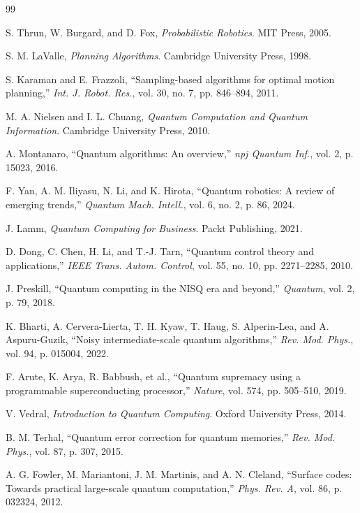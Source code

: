\documentclass[conference]{IEEEtran}
\begin{document}
\begin{thebibliography}{99}

 S. Thrun, W. Burgard, and D. Fox, \textit{Probabilistic Robotics}. MIT Press, 2005.

 S. M. LaValle, \textit{Planning Algorithms}. Cambridge University Press, 1998.

 S. Karaman and E. Frazzoli, ``Sampling-based algorithms for optimal motion planning,'' \textit{Int. J. Robot. Res.}, vol. 30, no. 7, pp. 846--894, 2011.

 M. A. Nielsen and I. L. Chuang, \textit{Quantum Computation and Quantum Information}. Cambridge University Press, 2010.

 A. Montanaro, ``Quantum algorithms: An overview,'' \textit{npj Quantum Inf.}, vol. 2, p. 15023, 2016.

 F. Yan, A. M. Iliyasu, N. Li, and K. Hirota, ``Quantum robotics: A review of emerging trends,'' \textit{Quantum Mach. Intell.}, vol. 6, no. 2, p. 86, 2024.

 J. Lamm, \textit{Quantum Computing for Business}. Packt Publishing, 2021.

 D. Dong, C. Chen, H. Li, and T.-J. Tarn, ``Quantum control theory and applications,'' \textit{IEEE Trans. Autom. Control}, vol. 55, no. 10, pp. 2271--2285, 2010.

 J. Preskill, ``Quantum computing in the NISQ era and beyond,'' \textit{Quantum}, vol. 2, p. 79, 2018.

 K. Bharti, A. Cervera-Lierta, T. H. Kyaw, T. Haug, S. Alperin-Lea, and A. Aspuru-Guzik, ``Noisy intermediate-scale quantum algorithms,'' \textit{Rev. Mod. Phys.}, vol. 94, p. 015004, 2022.

 F. Arute, K. Arya, R. Babbush, et al., ``Quantum supremacy using a programmable superconducting processor,'' \textit{Nature}, vol. 574, pp. 505--510, 2019.

 V. Vedral, \textit{Introduction to Quantum Computing}. Oxford University Press, 2014.

 B. M. Terhal, ``Quantum error correction for quantum memories,'' \textit{Rev. Mod. Phys.}, vol. 87, p. 307, 2015.

 A. G. Fowler, M. Mariantoni, J. M. Martinis, and A. N. Cleland, ``Surface codes: Towards practical large-scale quantum computation,'' \textit{Phys. Rev. A}, vol. 86, p. 032324, 2012.


\end{thebibliography}
\end{document}
